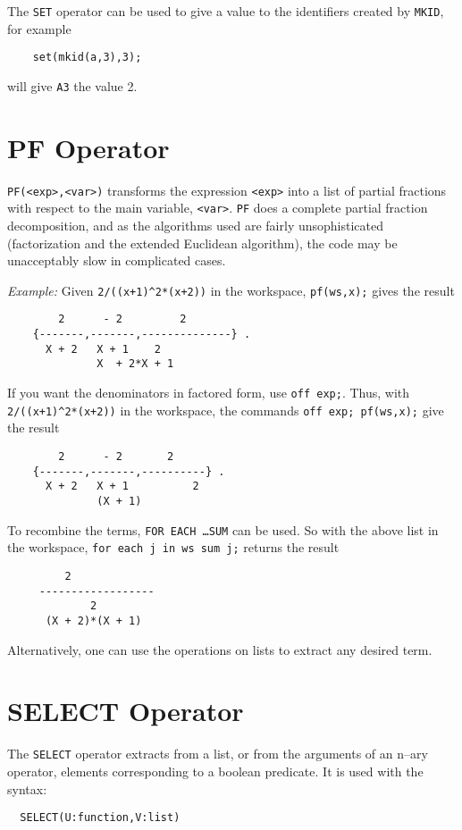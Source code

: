 The {\tt SET} operator can be used to give a value to the
identifiers created by {\tt MKID}, for example
\begin{verbatim}
	set(mkid(a,3),3);
\end{verbatim}
will give {\tt A3} the value 2.

\section{PF Operator}
\hypertarget{operator:PF}{}

{\tt PF(<exp>,<var>)} transforms the expression {\tt <exp>} into a list of
partial fractions with respect to the main variable, {\tt <var>}.  {\tt PF}
does a complete partial fraction decomposition, and as the algorithms used
are fairly unsophisticated (factorization and the extended Euclidean
algorithm), the code may be unacceptably slow in complicated cases.

{\it Example:}
Given {\tt 2/((x+1)\verb|^|2*(x+2))} in the workspace,
{\tt pf(ws,x);} gives the result
\begin{verbatim}
	    2      - 2         2
	{-------,-------,--------------} .
	  X + 2   X + 1    2
			  X  + 2*X + 1
\end{verbatim}

If you want the denominators in factored form, use {\tt off exp;}.
Thus, with {\tt 2/((x+1)\verb|^|2*(x+2))} in the workspace, the commands
{\tt off exp; pf(ws,x);} give the result
\begin{verbatim}
	    2      - 2       2
	{-------,-------,----------} .
	  X + 2   X + 1          2
			  (X + 1)
\end{verbatim}

To recombine the terms, {\tt FOR EACH \ldots SUM} can be used.  So with
the above list in the workspace, {\tt for each j in ws sum j;} returns the
result
\begin{verbatim}
	     2
     ------------------
		     2
      (X + 2)*(X + 1)
\end{verbatim}

Alternatively, one can use the operations on lists to extract any desired
term.

\section{SELECT Operator}
\hypertarget{operator:SELECT}{}

The {\tt SELECT} operator extracts from a list,
or from the arguments of an n--ary operator, elements corresponding
to a boolean predicate. It is used with the syntax:
\begin{verbatim}
  SELECT(U:function,V:list)
\end{verbatim}

